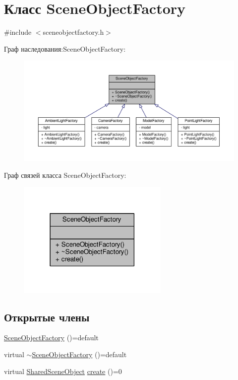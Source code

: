 \hypertarget{class_scene_object_factory}{}\section{Класс Scene\+Object\+Factory}
\label{class_scene_object_factory}


{\ttfamily \#include $<$sceneobjectfactory.\+h$>$}



Граф наследования\+:Scene\+Object\+Factory\+:
\nopagebreak
\begin{figure}[H]
\begin{center}
\leavevmode
\includegraphics[width=350pt]{df/def/class_scene_object_factory__inherit__graph}
\end{center}
\end{figure}


Граф связей класса Scene\+Object\+Factory\+:
\nopagebreak
\begin{figure}[H]
\begin{center}
\leavevmode
\includegraphics[width=207pt]{dc/dfc/class_scene_object_factory__coll__graph}
\end{center}
\end{figure}
\subsection*{Открытые члены}
\begin{DoxyCompactItemize}
\item 
\hyperlink{class_scene_object_factory_a427946fc1492afadea4c6933074f14f6}{Scene\+Object\+Factory} ()=default
\item 
virtual \hyperlink{class_scene_object_factory_ad0967a423a589ce6aaf65bccdb7fe9e2}{$\sim$\+Scene\+Object\+Factory} ()=default
\item 
virtual \hyperlink{sceneobject_8h_af9afe0f4fe2038e305b8b22ff495305f}{Shared\+Scene\+Object} \hyperlink{class_scene_object_factory_a9b90daaddbc34b747c072f770bc6b993}{create} ()=0
\end{DoxyCompactItemize}



